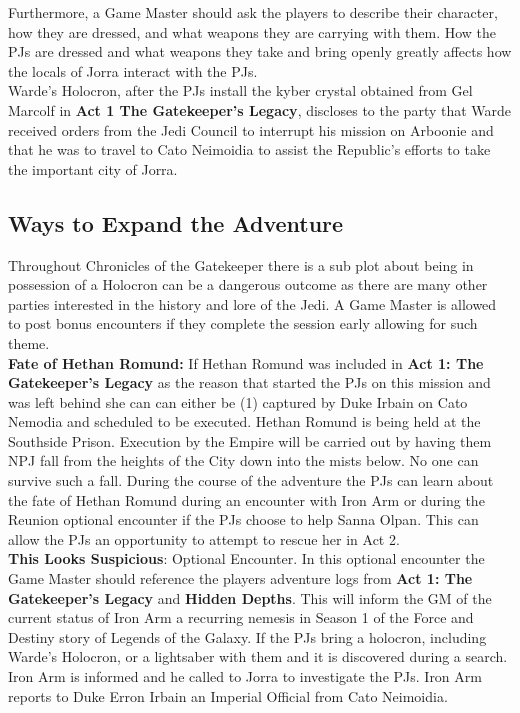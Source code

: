 \documentclass[twoside]{article}
\begin{document}
Furthermore, a Game Master should ask the players to describe their character, how they are dressed, and what weapons they are carrying with them.  How the PJs are dressed and what weapons they take and bring openly greatly affects how the locals of Jorra interact with the PJs.\\

Warde's Holocron, after the PJs install the kyber crystal obtained from Gel Marcolf in \textbf{Act 1 The Gatekeeper's Legacy}, discloses to the party that Warde received orders from the Jedi Council to interrupt his mission on Arboonie and that he was to travel to Cato Neimoidia to assist the Republic's efforts to take the important city of Jorra.\\

\subsection{Ways to Expand the Adventure}
Throughout Chronicles of the Gatekeeper there is a sub plot about being in possession of a Holocron can be a dangerous outcome as there are many other parties interested in the history and lore of the Jedi.  A Game Master is allowed to post bonus encounters if they complete the session early allowing for such theme.\\

\textbf{Fate of Hethan Romund:} If Hethan Romund was included in \textbf{Act 1: The Gatekeeper's Legacy} as the reason that started the PJs on this mission and was left behind she can can either be (1) captured by Duke Irbain on Cato Nemodia and scheduled to be executed.  Hethan Romund is being held at the Southside Prison.  Execution by the Empire will be carried out by having them NPJ fall from the heights of the City down into the mists below.  No one can survive such a fall. During the course of the adventure the PJs can learn about the fate of Hethan Romund during an encounter with Iron Arm or during the Reunion optional encounter if the PJs choose to help Sanna Olpan.  This can allow the PJs an opportunity to attempt to rescue her in Act 2. \\

\textbf{This Looks Suspicious}: Optional Encounter.  In this optional encounter the Game Master should reference the players adventure logs from \textbf{Act 1: The Gatekeeper's Legacy} and \textbf{Hidden Depths}.  This will inform the GM of the current status of Iron Arm a recurring nemesis in Season 1 of the Force and Destiny story of Legends of the Galaxy.  If the PJs bring a holocron, including Warde's Holocron, or a lightsaber with them and it is discovered during a search.  Iron Arm is informed and he called to Jorra to investigate the PJs.  Iron Arm reports to Duke Erron Irbain an Imperial Official from Cato Neimoidia. \\
\end{document}
